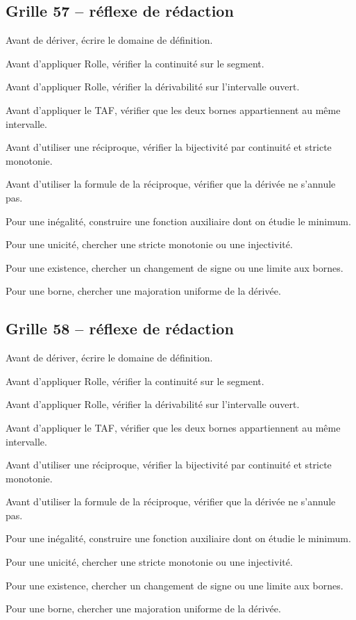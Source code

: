 \documentclass[11pt,a4paper]{article}
\begin{document}
\subsection*{Grille 57 -- réflexe de rédaction}

\begin{methodebox}

Avant de dériver, écrire le domaine de définition.

Avant d'appliquer Rolle, vérifier la continuité sur le segment.

Avant d'appliquer Rolle, vérifier la dérivabilité sur l'intervalle ouvert.

Avant d'appliquer le TAF, vérifier que les deux bornes appartiennent au même intervalle.

Avant d'utiliser une réciproque, vérifier la bijectivité par continuité et stricte monotonie.

Avant d'utiliser la formule de la réciproque, vérifier que la dérivée ne s'annule pas.

Pour une inégalité, construire une fonction auxiliaire dont on étudie le minimum.

Pour une unicité, chercher une stricte monotonie ou une injectivité.

Pour une existence, chercher un changement de signe ou une limite aux bornes.

Pour une borne, chercher une majoration uniforme de la dérivée.

\end{methodebox}

\subsection*{Grille 58 -- réflexe de rédaction}

\begin{methodebox}

Avant de dériver, écrire le domaine de définition.

Avant d'appliquer Rolle, vérifier la continuité sur le segment.

Avant d'appliquer Rolle, vérifier la dérivabilité sur l'intervalle ouvert.

Avant d'appliquer le TAF, vérifier que les deux bornes appartiennent au même intervalle.

Avant d'utiliser une réciproque, vérifier la bijectivité par continuité et stricte monotonie.

Avant d'utiliser la formule de la réciproque, vérifier que la dérivée ne s'annule pas.

Pour une inégalité, construire une fonction auxiliaire dont on étudie le minimum.

Pour une unicité, chercher une stricte monotonie ou une injectivité.

Pour une existence, chercher un changement de signe ou une limite aux bornes.

Pour une borne, chercher une majoration uniforme de la dérivée.

\end{methodebox}
\end{document}
